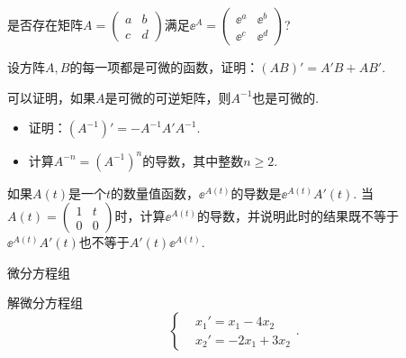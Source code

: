 \begin{problem}
  \cite{31} 是否存在矩阵$A=\begin{pmatrix}
    a & b \\
    c & d
  \end{pmatrix}$满足$\ee^A=\begin{pmatrix}
    \ee^a & \ee^b \\
    \ee^c & \ee^d
  \end{pmatrix}$?
\end{problem}

\begin{mybox}
  \begin{problem}[矩阵的导数.]
    \begin{enum}
      \item\label{prob4.46a} 设方阵$A,B$的每一项都是可微的函数，证明：$(AB)'=A'B+AB'$.
      \item\label{prob4.46b} 可以证明，如果$A$是可微的可逆矩阵，则$A^{-1}$也是可微的.
      \begin{itemize}
        \item 证明：$(A^{-1})'=-A^{-1}A'A^{-1}$.
        \item 计算$A^{-n}=(A^{-1})^n$的导数，其中整数$n\ge2$.
      \end{itemize}
    \end{enum}
  \end{problem}
\end{mybox}

\begin{problem}
  \cite[p.205]{6} 如果$A(t)$是一个$t$的数量值函数，$\ee^{A(t)}$的导数是$\ee^{A(t)}A'(t)$. 当$A(t)=\begin{pmatrix}
    1 & t \\
    0 & 0
  \end{pmatrix}$时，计算$\ee^{A(t)}$的导数，并说明此时的结果既不等于$\ee^{A(t)}A'(t)$也不等于$A'(t)\ee^{A(t)}$.
\end{problem}

{\kaishu 微分方程组}

\begin{problem}
  解微分方程组
  \[
    \left\{
      \begin{aligned}
        & x_1' = x_1 - 4x_2 \\
        & x_2' = -2x_1 + 3x_2
      \end{aligned}
    \right..
  \]
\end{problem}

